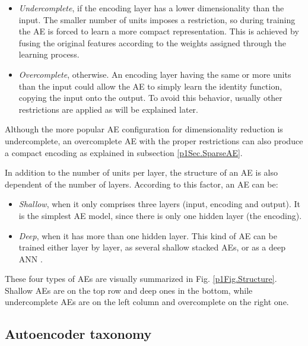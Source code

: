 \begin{itemize}
	\item \textit{Undercomplete}, if the encoding layer has a lower dimensionality than the input. The smaller number of units imposes a restriction, so during training the AE is forced to learn a more compact representation. This is achieved by fusing the original features according to the weights assigned through the learning process.
	
	\item \textit{Overcomplete}, otherwise. An encoding layer having the same or more units than the input could allow the AE to simply learn the identity function, copying the input onto the output. To avoid this behavior, usually other restrictions are applied as will be explained later.
\end{itemize}

Although the more popular AE configuration for dimensionality reduction is undercomplete, an overcomplete AE with the proper restrictions can also produce a compact encoding as explained in subsection \ref{p1Sec.SparseAE}.

In addition to the number of units per layer, the structure of an AE is also dependent of the number of layers. According to this factor, an AE can be:

\begin{itemize}
	\item \textit{Shallow}, when it only comprises three layers (input, encoding and output). It is the simplest AE model, since there is only one hidden layer (the encoding).
	
	\item \textit{Deep}, when it has more than one hidden layer. This kind of AE can be trained either layer by layer, as several shallow stacked AEs, or as a deep ANN .
\end{itemize}

These four types of AEs are visually summarized in Fig. \ref{p1Fig.Structure}. Shallow AEs are on the top row and deep ones in the bottom, while undercomplete AEs are on the left column and overcomplete on the right one.


\subsection{Autoencoder taxonomy}


